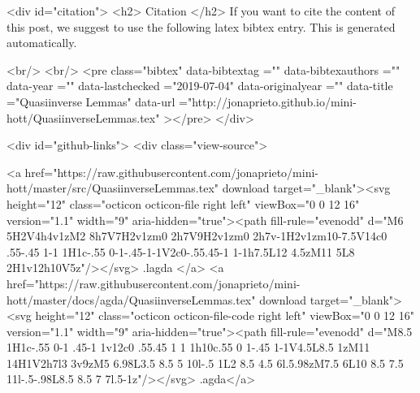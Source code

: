   
  <div id="citation">
  <h2> Citation </h2>
  If you want to cite the content of this post,
  we suggest to use the following latex bibtex entry.
  This is generated automatically.

  <br/>
  <br/>
  <pre class="bibtex"
       data-bibtextag =""
       data-bibtexauthors =""
       data-year =""
       data-lastchecked ="2019-07-04"
       data-originalyear =""
       data-title ="Quasiinverse Lemmas"
       data-url ="http://jonaprieto.github.io/mini-hott/QuasiinverseLemmas.tex"
  ></pre>
  </div>
  

  <div id="github-links">
    <div class="view-source">
      
        <a href="https://raw.githubusercontent.com/jonaprieto/mini-hott/master/src/QuasiinverseLemmas.tex" download target="_blank"><svg height="12" class="octicon octicon-file right left" viewBox="0 0 12 16" version="1.1" width="9" aria-hidden="true"><path fill-rule="evenodd" d="M6 5H2V4h4v1zM2 8h7V7H2v1zm0 2h7V9H2v1zm0 2h7v-1H2v1zm10-7.5V14c0 .55-.45 1-1 1H1c-.55 0-1-.45-1-1V2c0-.55.45-1 1-1h7.5L12 4.5zM11 5L8 2H1v12h10V5z"/></svg> .lagda </a>
        <a href="https://raw.githubusercontent.com/jonaprieto/mini-hott/master/docs/agda/QuasiinverseLemmas.tex" download target="_blank"><svg height="12" class="octicon octicon-file-code right left" viewBox="0 0 12 16" version="1.1" width="9" aria-hidden="true"><path fill-rule="evenodd" d="M8.5 1H1c-.55 0-1 .45-1 1v12c0 .55.45 1 1 1h10c.55 0 1-.45 1-1V4.5L8.5 1zM11 14H1V2h7l3 3v9zM5 6.98L3.5 8.5 5 10l-.5 1L2 8.5 4.5 6l.5.98zM7.5 6L10 8.5 7.5 11l-.5-.98L8.5 8.5 7 7l.5-1z"/></svg> .agda</a>
      
